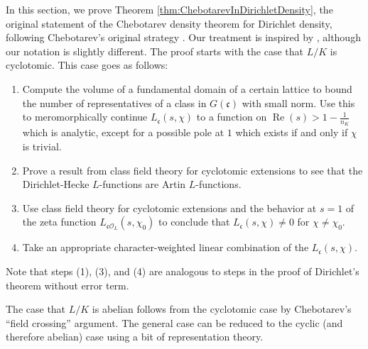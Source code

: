 \documentclass[12pt]{amsart}
\theoremstyle{definition}
\theoremstyle{remark}
\numberwithin{equation}{section}
\newcommand{\cO}{\mathcal O}
\newcommand{\fkc}{\mathfrak c}
\DeclareMathOperator{\re}{Re}
\begin{document}
In this section, we prove Theorem \ref{thm:ChebotarevInDirichletDensity}, the original statement of the Chebotarev density theorem for Dirichlet density, following Chebotarev's original strategy \cite{Chebotarev26}. Our treatment is inspired by \cite{FriedJarden08}, although our notation is slightly different. The proof starts with the case that $L/K$ is cyclotomic. This case goes as follows:
\begin{enumerate}
\item Compute the volume of a fundamental domain of a certain lattice to bound the number of representatives of a class in $G(\fkc)$ with small norm. Use this to meromorphically continue $L_{\fkc}(s,\chi)$ to a function on $\re(s) > 1 - \frac{1}{n_{K}}$ which is analytic, except for a possible pole at $1$ which exists if and only if $\chi$ is trivial.
\item Prove a result from class field theory for cyclotomic extensions to see that the Dirichlet-Hecke $L$-functions are Artin $L$-functions.
\item Use class field theory for cyclotomic extensions and the behavior at $s = 1$ of the zeta function $L_{\fkc\cO_{L}}(s,\chi_{0})$ to conclude that $L_{\fkc}(s,\chi) \neq 0$ for $\chi \neq \chi_{0}$.
\item Take an appropriate character-weighted linear combination of the $L_{\fkc}(s,\chi)$.
\end{enumerate}
Note that steps (1), (3), and (4) are analogous to steps in the proof of Dirichlet's theorem without error term.

The case that $L/K$ is abelian follows from the cyclotomic case by Chebotarev's ``field crossing'' argument. The general case can be reduced to the cyclic (and therefore abelian) case using a bit of representation theory.
\end{document}
